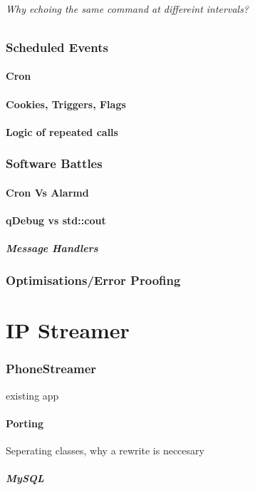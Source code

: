 \documentclass[11pt]{article} %
\begin{document}
\paragraph{Why echoing the same command at differeint intervals?}
\section{Scheduled Events}
\subsection{Cron}
\subsection{Cookies, Triggers, Flags}
\subsection{Logic of repeated calls}
\section{Software Battles}
\subsection{Cron Vs Alarmd}
\subsection{qDebug vs std::cout}
\subsubsection{Message Handlers}
\section{Optimisations/Error Proofing}


\part{IP Streamer}
\section{PhoneStreamer}{existing app}
\subsection{Porting}{Seperating classes, why a rewrite is neccesary}
\subsubsection{MySQL}
\end{document}
